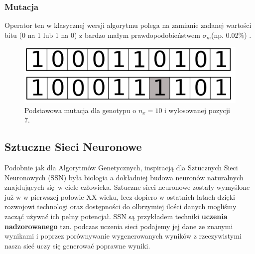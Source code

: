 \documentclass{article}
\begin{document}
\subsubsection{Mutacja}
Operator ten w klasycznej wersji algorytmu polega na zamianie zadanej wartości bitu
(0 na 1 lub 1 na 0) z bardzo małym  prawdopodobieństwem $\sigma_m$(np. 0.02\%)
\cite{goldberg}.
\begin{figure}[H]
\centering
\includegraphics[scale=0.2]{mutation_v2.png}
\caption{Podstawowa mutacja dla genotypu o $n_x = 10$ i wylosowanej pozycji 7.}
\end{figure}



\subsection{Sztuczne Sieci Neuronowe}
\label{sec:ssn}
Podobnie jak dla Algorytmów Genetycznych, inspiracją dla Sztucznych Sieci Neuronowych (SSN) 
była biologia a dokładniej budowa neuronów naturalnych znajdujących się w ciele człowieka.
Sztuczne sieci neuronowe zostały wymyślone już w w pierwszej połowie XX wieku, lecz dopiero w ostatnich latach
dzięki rozwojowi technologi oraz dostępności do olbrzymiej ilości danych mogliśmy zacząć używać
ich pełny potencjał. SSN są przykładem techniki \textbf{uczenia nadzorowanego} tzn.
podczas uczenia sieci podajemy jej dane ze znanymi wynikami i poprzez porównywanie wygenerowanych
wyników z rzeczywistymi nasza sieć uczy się generować poprawne wyniki.
\end{document}
